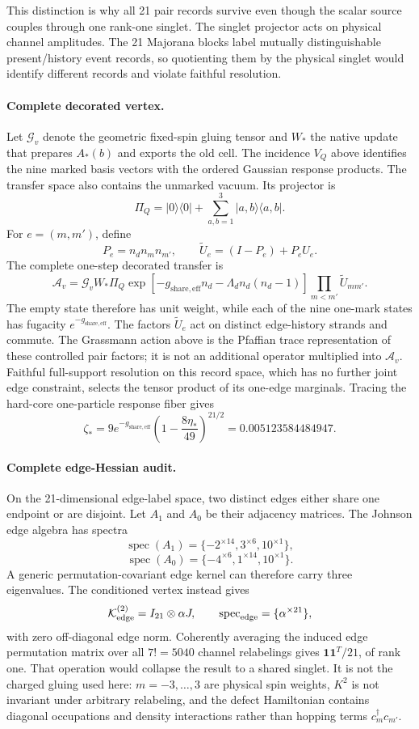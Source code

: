 \documentclass[11pt]{article}
\begin{document}
This distinction is why all 21 pair records survive even though the scalar source couples through one rank-one singlet. The singlet projector acts on physical channel amplitudes. The 21 Majorana blocks label mutually distinguishable present/history event records, so quotienting them by the physical singlet would identify different records and violate faithful resolution.

\paragraph{Complete decorated vertex.}
Let $\mathcal G_v$ denote the geometric fixed-spin gluing tensor and $W_*$ the native update that prepares $A_*(b)$ and exports the old cell. The incidence $V_Q$ above identifies the nine marked basis vectors with the ordered Gaussian response products. The transfer space also contains the unmarked vacuum. Its projector is
\[
\Pi_Q=|0\rangle\langle0|+\sum_{a,b=1}^3|a,b\rangle\langle a,b|.
\]
For $e=(m,m')$, define
\[
P_e=n_dn_mn_{m'},
\qquad
\widetilde U_e=(I-P_e)+P_eU_e.
\]
The complete one-step decorated transfer is
\[
\boxed{
\mathcal A_v
=\mathcal G_vW_*\Pi_Q
\exp\!\left[-g_{\mathrm{share,eff}}n_d-\Lambda_dn_d(n_d-1)\right]
\prod_{m<m'}\widetilde U_{mm'}.
}
\]
The empty state therefore has unit weight, while each of the nine one-mark states has fugacity $e^{-g_{\mathrm{share,eff}}}$. The factors $\widetilde U_e$ act on distinct edge-history strands and commute. The Grassmann action above is the Pfaffian trace representation of these controlled pair factors; it is not an additional operator multiplied into $\mathcal A_v$. Faithful full-support resolution on this record space, which has no further joint edge constraint, selects the tensor product of its one-edge marginals. Tracing the hard-core one-particle response fiber gives
\[
\boxed{
\zeta_*
=9e^{-g_{\mathrm{share,eff}}}
\left(1-\frac{8\eta_*}{49}\right)^{21/2}
=0.005123584484947.
}
\]

\paragraph{Complete edge-Hessian audit.}
On the 21-dimensional edge-label space, two distinct edges either share one endpoint or are disjoint. Let $A_1$ and $A_0$ be their adjacency matrices. The Johnson edge algebra has spectra
\[
\operatorname{spec}(A_1)=\{-2^{\times14},3^{\times6},10^{\times1}\},
\]
\[
\operatorname{spec}(A_0)=\{-4^{\times6},1^{\times14},10^{\times1}\}.
\]
A generic permutation-covariant edge kernel can therefore carry three eigenvalues. The conditioned vertex instead gives
\[
\mathcal K_{\rm edge}^{(2)}=I_{21}\otimes\alpha J,
\qquad
\operatorname{spec}_{\rm edge}=\{\alpha^{\times21}\},
\]
with zero off-diagonal edge norm. Coherently averaging the induced edge permutation matrix over all $7!=5040$ channel relabelings gives $\mathbf1\mathbf1^T/21$, of rank one. That operation would collapse the result to a shared singlet. It is not the charged gluing used here: $m=-3,\ldots,3$ are physical spin weights, $K^2$ is not invariant under arbitrary relabeling, and the defect Hamiltonian contains diagonal occupations and density interactions rather than hopping terms $c_m^\dagger c_{m'}$.
\end{document}
